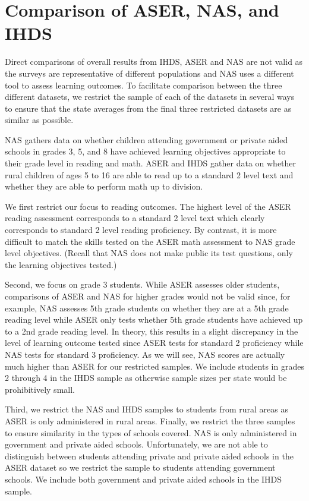 \documentclass[
  11pt,
]{article}
\begin{document}
\hypertarget{comparison}{%
\section{Comparison of ASER, NAS, and IHDS}\label{comparison}}

Direct comparisons of overall results from IHDS, ASER and NAS are not valid as the surveys are representative of different populations and NAS uses a different tool to assess learning outcomes. To facilitate comparison between the three different datasets, we restrict the sample of each of the datasets in several ways to ensure that the state averages from the final three restricted datasets are as similar as possible.

NAS gathers data on whether children attending government or private aided schools in grades 3, 5, and 8 have achieved learning objectives appropriate to their grade level in reading and math. ASER and IHDS gather data on whether rural children of ages 5 to 16 are able to read up to a standard 2 level text and whether they are able to perform math up to division.

We first restrict our focus to reading outcomes. The highest level of the ASER reading assessment corresponds to a standard 2 level text which clearly corresponds to standard 2 level reading proficiency. By contrast, it is more difficult to match the skills tested on the ASER math assessment to NAS grade level objectives. (Recall that NAS does not make public its test questions, only the learning objectives tested.)

Second, we focus on grade 3 students. While ASER assesses older students, comparisons of ASER and NAS for higher grades would not be valid since, for example, NAS assesses 5th grade students on whether they are at a 5th grade reading level while ASER only tests whether 5th grade students have achieved up to a 2nd grade reading level. In theory, this results in a slight discrepancy in the level of learning outcome tested since ASER tests for standard 2 proficiency while NAS tests for standard 3 proficiency. As we will see, NAS scores are actually much higher than ASER for our restricted samples. We include students in grades 2 through 4 in the IHDS sample as otherwise sample sizes per state would be prohibitively small.

Third, we restrict the NAS and IHDS samples to students from rural areas as ASER is only administered in rural areas. Finally, we restrict the three samples to ensure similarity in the types of schools covered. NAS is only administered in government and private aided schools. Unfortunately, we are not able to distinguish between students attending private and private aided schools in the ASER dataset so we restrict the sample to students attending government schools. We include both government and private aided schools in the IHDS sample.
\end{document}
